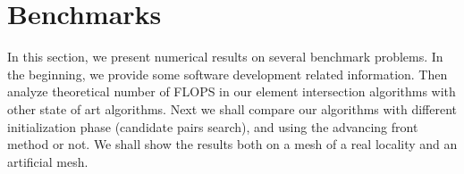 \documentclass{elsarticle}
\newcommand{\noteJB}[1]{{\color{Blue} \textbf{JB: } \textit{#1}}}
\begin{document}
% 





\section{Benchmarks}
\label{sec:benchmarks}


In this section, we present numerical results on several benchmark problems. 
In the beginning, we provide some software development related information.
Then analyze theoretical number of FLOPS in our element intersection algorithms with 
other state of art algorithms.
Next we shall compare our algorithms with different initialization phase (candidate pairs search),
and using the advancing front method or not. We shall show the results both on a mesh of a real locality
and an artificial mesh.
\end{document}

